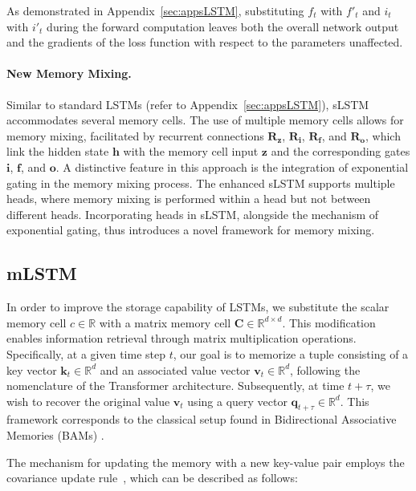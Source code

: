 As demonstrated in Appendix~\ref{sec:appsLSTM}, substituting $f_t$ with $f'_t$ and $i_t$ with $i'_t$ during the forward computation leaves both the overall network output and the gradients of the loss function with respect to the parameters unaffected.

\paragraph{New Memory Mixing.} Similar to standard LSTMs (refer to Appendix~\ref{sec:appsLSTM}), sLSTM accommodates several memory cells. The use of multiple memory cells allows for memory mixing, facilitated by recurrent connections $\mathbf{R}_{\mathbf{z}}$, $\mathbf{R}_{\mathbf{i}}$, $\mathbf{R}_{\mathbf{f}}$, and $\mathbf{R}_{\mathbf{o}}$, which link the hidden state $\mathbf{h}$ with the memory cell input $\mathbf{z}$ and the corresponding gates $\mathbf{i}$, $\mathbf{f}$, and $\mathbf{o}$. A distinctive feature in this approach is the integration of exponential gating in the memory mixing process. The enhanced sLSTM supports multiple heads, where memory mixing is performed within a head but not between different heads. Incorporating heads in sLSTM, alongside the mechanism of exponential gating, thus introduces a novel framework for memory mixing.

\subsection{mLSTM}
\label{sec:mLSTM}

In order to improve the storage capability of LSTMs, we substitute the scalar memory cell $c \in \mathbb{R}$ with a matrix memory cell $\mathbf{C} \in \mathbb{R}^{d \times d}$. This modification enables information retrieval through matrix multiplication operations. Specifically, at a given time step $t$, our goal is to memorize a tuple consisting of a key vector $\mathbf{k}_t \in \mathbb{R}^d$ and an associated value vector $\mathbf{v}_t \in \mathbb{R}^d$, following the nomenclature of the Transformer architecture. Subsequently, at time $t+\tau$, we wish to recover the original value $\mathbf{v}_t$ using a query vector $\mathbf{q}_{t+\tau} \in \mathbb{R}^d$. This framework corresponds to the classical setup found in Bidirectional Associative Memories (BAMs) \citep{Kohonen:72,Anderson:72,Nakano:72,Anderson:77}.

The mechanism for updating the memory with a new key-value pair employs the covariance update rule~\citep{Sejnowski:77,Dayan:91}, which can be described as follows:


